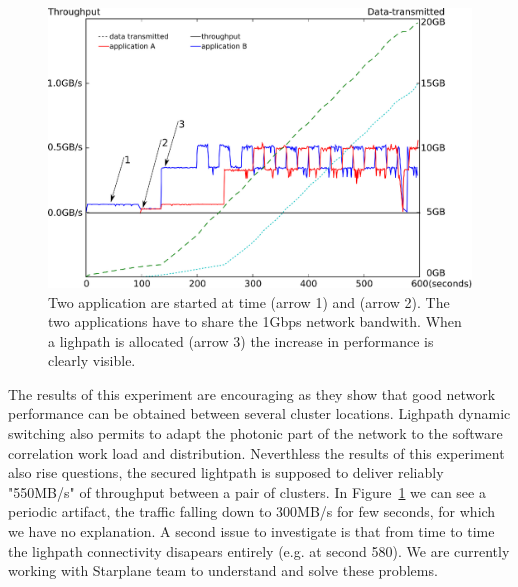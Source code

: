 \begin{figure}[ht]
  \centering
  \includegraphics[width=\textwidth] {img/timing.eps}
  \caption{\label{fig:timing} Two application are started at time
    (arrow 1) and (arrow 2). The two applications have to share the
    1Gbps network bandwith. When a lighpath is allocated (arrow 3) the
    increase in performance is clearly visible.}
\end{figure} 

The results of this experiment are encouraging as they show that good
network performance can be obtained between several cluster
locations. Lighpath dynamic switching also permits to adapt the
photonic part of the network to the software correlation work load and
distribution.  Neverthless the results of this experiment also rise
questions, the secured lightpath is supposed to deliver reliably
"550MB/s" of throughput between a pair of clusters.  In
Figure~\ref{fig:timing} we can see a periodic artifact, the traffic
falling down to 300MB/s for few seconds, for which we have no
explanation. A second issue to investigate is that from time to time
the lighpath connectivity disapears entirely (e.g. at second 580). We
are currently working with Starplane team to understand and solve
these problems.


